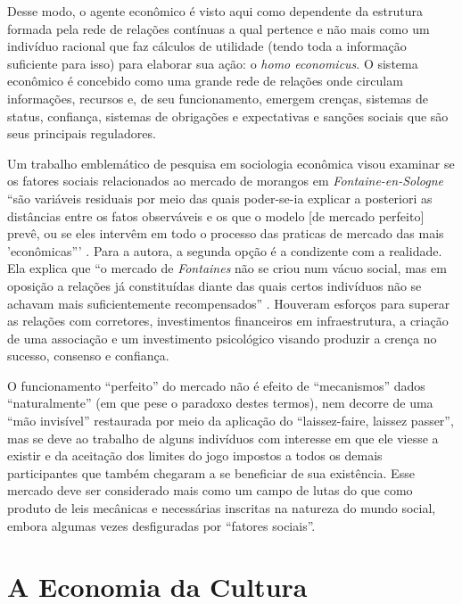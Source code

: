 \documentclass[a4paper, 12pt, openright, oneside, german, french, english, brazil]{abntex2}
\begin{document}
	Desse modo, o agente econômico é visto aqui como dependente da estrutura formada pela rede de relações contínuas a qual pertence e não mais como um indivíduo racional que faz cálculos de utilidade (tendo toda a informação suficiente para isso) para elaborar sua ação: o \textit{homo economicus}. O sistema econômico é concebido como uma grande rede de relações onde circulam informações, recursos e, de seu funcionamento, emergem crenças, sistemas de status, confiança, sistemas de obrigações e expectativas e sanções sociais que são seus principais reguladores.
	
	Um trabalho emblemático de pesquisa em sociologia econômica visou examinar se os fatores sociais relacionados ao mercado de morangos em \textit{Fontaine-en-Sologne} ``são variáveis residuais por meio das quais poder-se-ia explicar a posteriori as distâncias entre os fatos observáveis e os que o modelo [de mercado perfeito] prevê, ou se eles intervêm em todo o processo das praticas de mercado das mais 'econômicas''' \cite[p. 6]{garcia2003construccao}. Para a autora, a segunda opção é a condizente com a realidade. Ela explica que ``o mercado de \textit{Fontaines} não se criou num vácuo social, mas em oposição a relações já constituídas diante das quais certos indivíduos não se achavam mais suficientemente recompensados'' \cite[p. 33]{garcia2003construccao}. Houveram esforços para superar as relações com corretores, investimentos financeiros em infraestrutura, a criação de uma associação e um investimento psicológico visando produzir a crença no sucesso, consenso e confiança.
	
	\begin{citacao}
		O funcionamento ``perfeito'' do mercado não é efeito de ``mecanismos'' dados ``naturalmente'' (em que pese o paradoxo destes termos), nem decorre de uma ``mão invisível'' restaurada por meio da aplicação do ``laissez-faire, laissez passer'', mas se deve ao trabalho de alguns indivíduos com interesse em que ele viesse a existir e da aceitação dos limites do jogo impostos a todos os demais participantes que também chegaram a se beneficiar de sua existência. Esse mercado deve ser considerado mais como um campo de lutas do que como produto de leis mecânicas e necessárias inscritas na natureza do mundo social, embora algumas vezes desfiguradas por ``fatores sociais''. \cite[p. 35-6]{garcia2003construccao}
	\end{citacao}
	
	\section{A Economia da Cultura}
	
\end{document}
